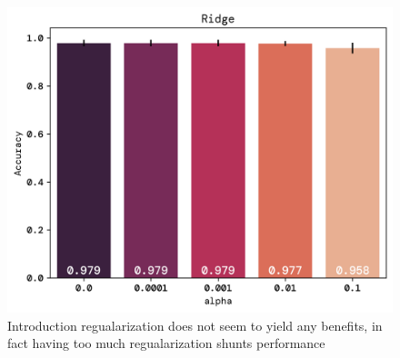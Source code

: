 \documentclass[twoside,11pt]{report}
\begin{document}
\begin{figure}[!ht]
\begin{minipage}[t]{0.5\textwidth - 1mm}
\begin{center}
            \includegraphics[width=\textwidth]{../runsAndFigures/accuracy_alpha.png}
        \end{center}
        \caption{Introduction regualarization does not seem to yield any benefits, in fact
        having too much regualarization shunts performance}\label{fig:accuracy_aplha}
    \end{minipage}
\end{figure}
\end{document}
